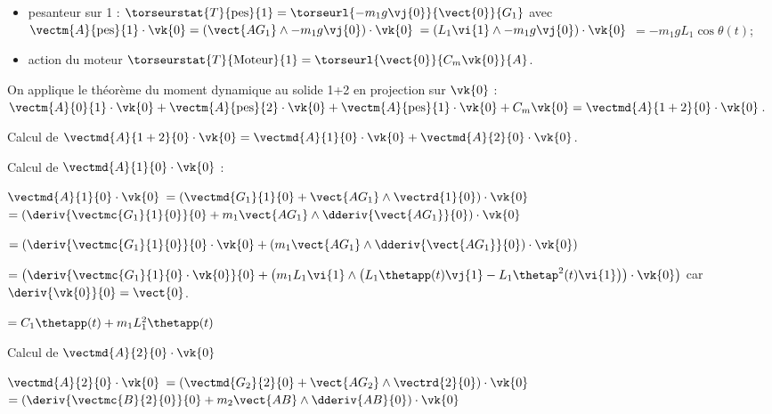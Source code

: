 \begin{corrigebox}
\begin{itemize}
\item pesanteur sur 1 : $\torseurstat{T}{\text{pes}}{1} = \torseurl{-m_1 g \vj{0}}{\vect{0}}{G_1}$ avec 
$\vectm{A}{\text{pes}}{1} \cdot \vk{0} = \left(\vect{AG_1}\wedge -m_1 g \vj{0} \right)\cdot \vk{0}$
$= \left(L_1 \vi{1}\wedge -m_1 g \vj{0} \right)\cdot \vk{0}$
$= -m_1 gL_1\cos\theta(t) $;

\item action du moteur $\torseurstat{T}{\text{Moteur}}{1} =  \torseurl{\vect{0}}{C_m \vk{0}}{A}$.
\end{itemize}

\vspace{.5cm}

On applique le théorème du moment dynamique au solide 1+2 en projection sur $\vk{0}$ :
$
\vectm{A}{0}{1}\cdot\vk{0} 
+ \vectm{A}{\text{pes}}{2} \cdot \vk{0}
+ \vectm{A}{\text{pes}}{1} \cdot \vk{0} + C_m \vk{0}
= \vectmd{A}{1+2}{0} \cdot \vk{0}$.

\vspace{.5cm}

Calcul de $\vectmd{A}{1+2}{0} \cdot \vk{0} = \vectmd{A}{1}{0} \cdot \vk{0} + \vectmd{A}{2}{0} \cdot \vk{0} $.

\vspace{.5cm}

Calcul de $\vectmd{A}{1}{0} \cdot \vk{0}$ : 

$\vectmd{A}{1}{0} \cdot \vk{0}$ 
$=\left(\vectmd{G_1}{1}{0} + \vect{AG_1} \wedge \vectrd{1}{0} \right)\cdot \vk{0}$
$=\left( \deriv{\vectmc{G_1}{1}{0}}{0} + m_1 \vect{AG_1} \wedge \dderiv{\vect{AG_1}}{0} \right)\cdot \vk{0}$

$=\left( \deriv{\vectmc{G_1}{1}{0}}{0}\cdot \vk{0} + \left(m_1 \vect{AG_1} \wedge \dderiv{\vect{AG_1}}{0}\right)\cdot \vk{0} \right)$

$=\left( \deriv{\vectmc{G_1}{1}{0}\cdot \vk{0}}{0} + \left(m_1 L_1 \vi{1} \wedge \left( L_1 \thetapp(t)\vj{1}-L_1  \thetap^2(t)\vi{1}\right)\right)\cdot \vk{0} \right)$ car $\deriv{\vk{0}}{0}=\vect{0}$.

$= C_1 \thetapp(t) + m_1 L_1^2 \thetapp(t)$ 

\vspace{.5cm}

Calcul de $\vectmd{A}{2}{0} \cdot \vk{0}$

$\vectmd{A}{2}{0} \cdot \vk{0}$ 
$=\left(\vectmd{G_2}{2}{0} + \vect{AG_2} \wedge \vectrd{2}{0} \right)\cdot \vk{0}$
$=\left( \deriv{\vectmc{B}{2}{0}}{0} + m_2 \vect{AB} \wedge \dderiv{AB}{0} \right)\cdot \vk{0}$


\end{corrigebox}
